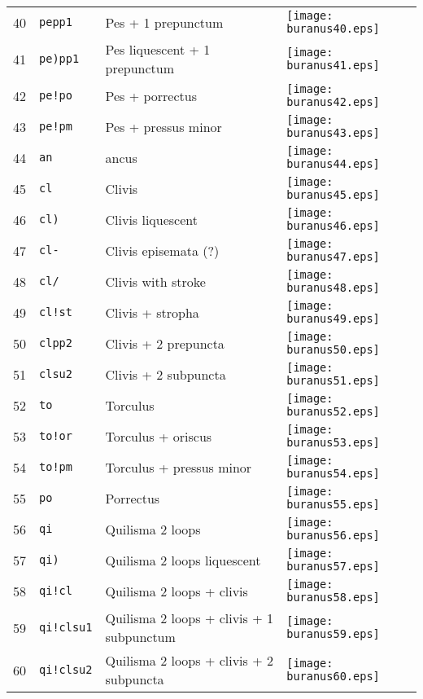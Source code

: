 \documentclass{scrarticle}
\begin{document}
\begin{longtable}{l|l|l|l}
40 & \texttt{pepp1} & Pes + 1 prepunctum & \texttt{[image: buranus40.eps]} \\
41 & \texttt{pe)pp1} & Pes liquescent + 1 prepunctum & \texttt{[image: buranus41.eps]} \\
42 & \texttt{pe!po} & Pes + porrectus & \texttt{[image: buranus42.eps]} \\
43 & \texttt{pe!pm} & Pes + pressus minor & \texttt{[image: buranus43.eps]} \\
44 & \texttt{an} & ancus & \texttt{[image: buranus44.eps]} \\
45 & \texttt{cl} & Clivis & \texttt{[image: buranus45.eps]} \\
46 & \texttt{cl)} & Clivis liquescent & \texttt{[image: buranus46.eps]} \\
47 & \texttt{cl-} & Clivis episemata (?) & \texttt{[image: buranus47.eps]} \\
48 & \texttt{cl/} & Clivis with stroke & \texttt{[image: buranus48.eps]} \\
49 & \texttt{cl!st} & Clivis + stropha & \texttt{[image: buranus49.eps]} \\
50 & \texttt{clpp2} & Clivis + 2 prepuncta & \texttt{[image: buranus50.eps]} \\
51 & \texttt{clsu2} & Clivis + 2 subpuncta & \texttt{[image: buranus51.eps]} \\
52 & \texttt{to} & Torculus & \texttt{[image: buranus52.eps]} \\
53 & \texttt{to!or} & Torculus + oriscus & \texttt{[image: buranus53.eps]} \\
54 & \texttt{to!pm} & Torculus + pressus minor & \texttt{[image: buranus54.eps]} \\
55 & \texttt{po} & Porrectus & \texttt{[image: buranus55.eps]} \\
56 & \texttt{qi} & Quilisma 2 loops & \texttt{[image: buranus56.eps]} \\
57 & \texttt{qi)} & Quilisma 2 loops liquescent & \texttt{[image: buranus57.eps]} \\
58 & \texttt{qi!cl} & Quilisma 2 loops + clivis & \texttt{[image: buranus58.eps]} \\
59 & \texttt{qi!clsu1} & Quilisma 2 loops + clivis + 1 subpunctum & \texttt{[image: buranus59.eps]} \\
60 & \texttt{qi!clsu2} & Quilisma 2 loops + clivis + 2 subpuncta & \texttt{[image: buranus60.eps]} \\

\end{longtable}
\end{document}
